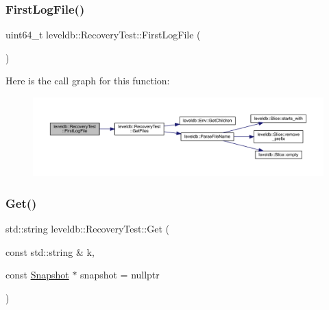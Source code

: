 \subsubsection{\texorpdfstring{FirstLogFile()}{FirstLogFile()}}
{\footnotesize\ttfamily uint64\+\_\+t leveldb\+::\+Recovery\+Test\+::\+First\+Log\+File (\begin{DoxyParamCaption}{ }\end{DoxyParamCaption})\hspace{0.3cm}{\ttfamily [inline]}}

Here is the call graph for this function\+:
\nopagebreak
\begin{figure}[H]
\begin{center}
\leavevmode
\includegraphics[width=350pt]{classleveldb_1_1_recovery_test_acc405124d7e1408642f64dadf0eb9227_cgraph}
\end{center}
\end{figure}
\mbox{\label{classleveldb_1_1_recovery_test_a296ba88823b34d714bb7c74ed6d83810}} 
\subsubsection{\texorpdfstring{Get()}{Get()}}
{\footnotesize\ttfamily std\+::string leveldb\+::\+Recovery\+Test\+::\+Get (\begin{DoxyParamCaption}\item[{const std\+::string \&}]{k,  }\item[{const \mbox{\hyperlink{classleveldb_1_1_snapshot}{Snapshot}} $\ast$}]{snapshot = {\ttfamily nullptr} }\end{DoxyParamCaption})\hspace{0.3cm}{\ttfamily [inline]}}

